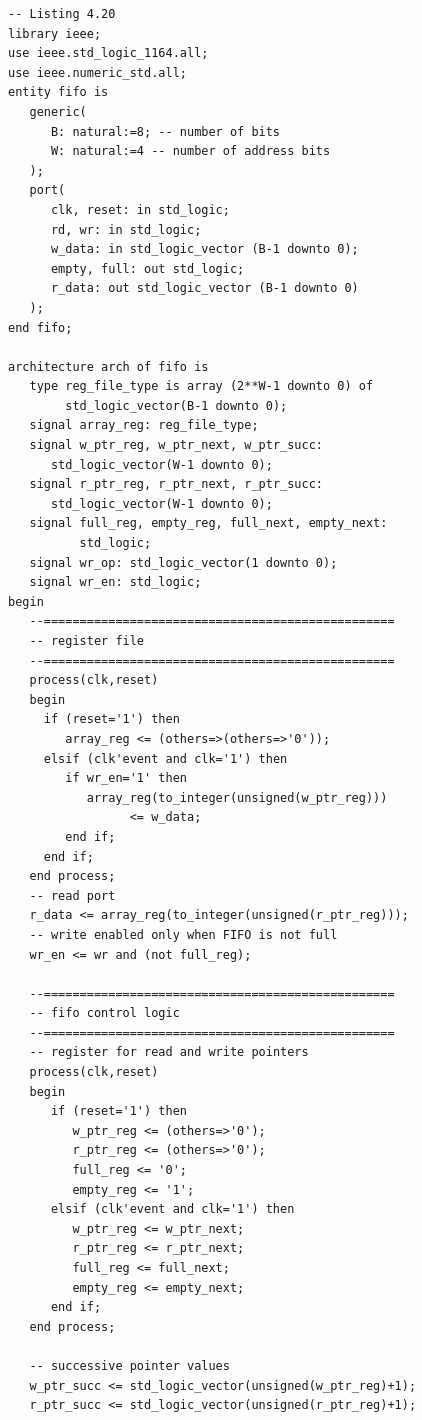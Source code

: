 \documentclass[a4paper,12pt,twoside]{article}
\begin{document}
\begin{lstlisting}
-- Listing 4.20
library ieee;
use ieee.std_logic_1164.all;
use ieee.numeric_std.all;
entity fifo is
   generic(
      B: natural:=8; -- number of bits
      W: natural:=4 -- number of address bits
   );
   port(
      clk, reset: in std_logic;
      rd, wr: in std_logic;
      w_data: in std_logic_vector (B-1 downto 0);
      empty, full: out std_logic;
      r_data: out std_logic_vector (B-1 downto 0)
   );
end fifo;

architecture arch of fifo is
   type reg_file_type is array (2**W-1 downto 0) of
        std_logic_vector(B-1 downto 0);
   signal array_reg: reg_file_type;
   signal w_ptr_reg, w_ptr_next, w_ptr_succ:
      std_logic_vector(W-1 downto 0);
   signal r_ptr_reg, r_ptr_next, r_ptr_succ:
      std_logic_vector(W-1 downto 0);
   signal full_reg, empty_reg, full_next, empty_next:
          std_logic;
   signal wr_op: std_logic_vector(1 downto 0);
   signal wr_en: std_logic;
begin
   --=================================================
   -- register file
   --=================================================
   process(clk,reset)
   begin
     if (reset='1') then
        array_reg <= (others=>(others=>'0'));
     elsif (clk'event and clk='1') then
        if wr_en='1' then
           array_reg(to_integer(unsigned(w_ptr_reg)))
                 <= w_data;
        end if;
     end if;
   end process;
   -- read port
   r_data <= array_reg(to_integer(unsigned(r_ptr_reg)));
   -- write enabled only when FIFO is not full
   wr_en <= wr and (not full_reg);

   --=================================================
   -- fifo control logic
   --=================================================
   -- register for read and write pointers
   process(clk,reset)
   begin
      if (reset='1') then
         w_ptr_reg <= (others=>'0');
         r_ptr_reg <= (others=>'0');
         full_reg <= '0';
         empty_reg <= '1';
      elsif (clk'event and clk='1') then
         w_ptr_reg <= w_ptr_next;
         r_ptr_reg <= r_ptr_next;
         full_reg <= full_next;
         empty_reg <= empty_next;
      end if;
   end process;

   -- successive pointer values
   w_ptr_succ <= std_logic_vector(unsigned(w_ptr_reg)+1);
   r_ptr_succ <= std_logic_vector(unsigned(r_ptr_reg)+1);


\end{lstlisting}
\end{document}
